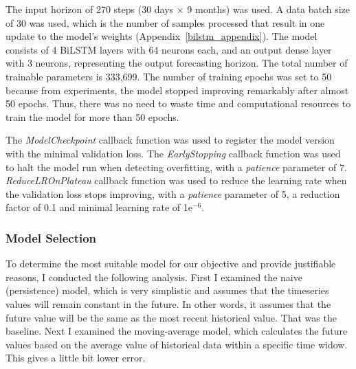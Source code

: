 The input horizon of 270 steps (30 days $\times$ 9 months) was used.
A data batch size of 30 was used, which is the number of samples processed that result in one update to the model's weights (Appendix~\ref{bilstm_appendix}).
The model consists of 4 BiLSTM layers with 64 neurons each, and an output dense layer with 3 neurons, representing the output forecasting horizon.
The total number of trainable parameters is 333,699.
The number of training epochs was set to 50 because from experiments, the model stopped improving remarkably after almost 50 epochs. Thus, there was no need to waste time and computational resources to train the model for more than 50 epochs.

The \textit{ModelCheckpoint} callback function was used to register the model version with the minimal validation loss. 
The \textit{EarlyStopping} callback function was used to halt the model run when detecting overfitting, with a \textit{patience} parameter of 7. 
\textit{ReduceLROnPlateau} callback function was used to reduce the learning rate when the validation loss stops improving, with a \textit{patience} parameter of 5, a reduction factor of 0.1 and minimal learning rate of 1e$^{-6}$.
\subsubsection{Model Selection}
To determine the most suitable model for our objective and provide justifiable reasons, I conducted the following analysis.
First I examined the naive (persistence) model, which is very simplistic and assumes that the timeseries values will remain constant in the future. In other words, it assumes that the future value will be the same as the most recent historical value. That was the baseline. Next I examined the moving-average model, which calculates the future values based on the average value of historical data within a specific time widow. This gives a little bit lower error.

